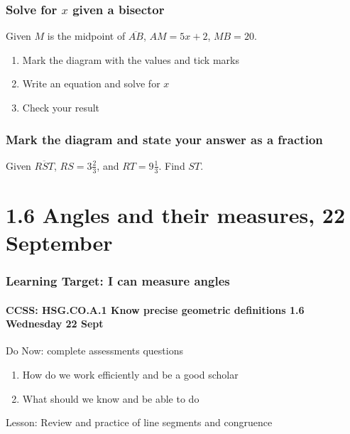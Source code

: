 \documentclass{beamer}
\begin{document}
  \frame
  {
    \frametitle{Solve for $x$ given a bisector}
    Given $M$ is the midpoint of $\overline{AB}$, $AM=5x+2$, $MB=20$.
    \begin{enumerate}
      \item Mark the diagram with the values and tick marks
      \item Write an equation and solve for $x$
      \item Check your result
    \end{enumerate} \vspace{1cm}
      \begin{center}
      \end{center} \vspace{4cm}
  }

  \frame
  {
    \frametitle{Mark the diagram and state your answer as a fraction}
      Given $\overline{RST}$, $RS=3 \frac{2}{3}$, and $RT=9 \frac{1}{3}$. Find ${ST}$.\\[0.75cm]
         \vspace{5cm} 
  }

\section{1.6 Angles and their measures, 22 September}
\frame
{
  \frametitle{Learning Target: I can measure angles}
  \framesubtitle{CCSS: HSG.CO.A.1 Know precise geometric definitions  \hfill \alert{1.6 Wednesday 22 Sept}}

  \begin{block}{Do Now: complete assessments questions}
  \begin{enumerate}
      \item How do we work efficiently and be a good scholar
      \item What should we know and be able to do
  \end{enumerate}
  \end{block}
  Lesson: Review and practice of line segments and congruence %
}
\end{document}
